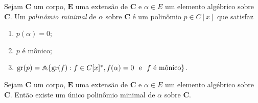 \begin{definition}
	Sejam $\bm C$ um corpo, $\bm E$ uma extensão de $\bm C$ e $\alpha \in E$ um elemento algébrico sobre $\bm C$. Um \emph{polinômio minimal} de $\alpha$ sobre $\bm C$ é um polinômio $p \in C[x]$ que satisfaz
	\begin{enumerate}
	\item $p(\alpha) = 0$;
	\item $p$ é mônico;
	\item $\g(p) = \min\{\g(f) : f \in C[x]^*, f(\alpha)=0 \text{\ \ e\ \ } f \text{\ é mônico}\}$.
	\end{enumerate}
\end{definition}

\begin{proposition}
	Sejam $\bm C$ um corpo, $\bm E$ uma extensão de $\bm C$ e $\alpha \in E$ um elemento algébrico sobre $\bm C$. Então existe um único polinômio minimal de $\alpha$ sobre $\bm C$.
\end{proposition}
